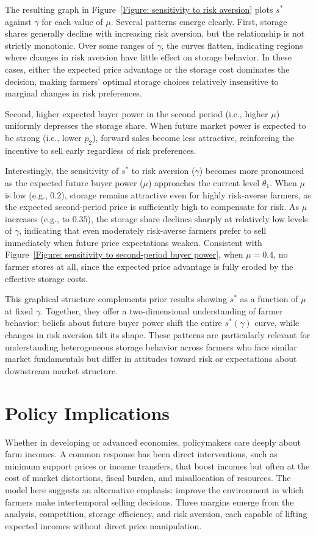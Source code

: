 The resulting graph in Figure~\ref{Figure: sensitivity to risk aversion} plots $s^*$ against $\gamma$ for each value of $\mu$. Several patterns emerge clearly. First, storage shares generally decline with increasing risk aversion, but the relationship is not strictly monotonic. Over some ranges of $\gamma$, the curves flatten, indicating regions where changes in risk aversion have little effect on storage behavior. In these cases, either the expected price advantage or the storage cost dominates the decision, making farmers' optimal storage choices relatively insensitive to marginal changes in risk preferences. 

Second, higher expected buyer power in the second period (i.e., higher $\mu$) uniformly depresses the storage share. When future market power is expected to be strong (i.e., lower $p_2$), forward sales become less attractive, reinforcing the incentive to sell early regardless of risk preferences.

Interestingly, the sensitivity of $s^*$ to risk aversion ($\gamma$) becomes more pronounced as the expected future buyer power ($\mu$) approaches the current level $\theta_1$. When $\mu$ is low (e.g., $0.2$), storage remains attractive even for highly risk-averse farmers, as the expected second-period price is sufficiently high to compensate for risk. As $\mu$ increases (e.g., to $0.35$), the storage share declines sharply at relatively low levels of $\gamma$, indicating that even moderately risk-averse farmers prefer to sell immediately when future price expectations weaken. Consistent with Figure~\ref{Figure: sensitivity to second-period buyer power}, when $\mu = 0.4$, no farmer stores at all, since the expected price advantage is fully eroded by the effective storage costs.


This graphical structure complements prior results showing $s^*$ as a function of $\mu$ at fixed $\gamma$. Together, they offer a two-dimensional understanding of farmer behavior: beliefs about future buyer power shift the entire $s^*(\gamma)$ curve, while changes in risk aversion tilt its shape. These patterns are particularly relevant for understanding heterogeneous storage behavior across farmers who face similar market fundamentals but differ in attitudes toward risk or expectations about downstream market structure.



\section{Policy Implications}
\noindent
Whether in developing or advanced economies, policymakers care deeply about farm incomes. A common response has been direct interventions, such as minimum support prices or income transfers, that boost incomes but often at the cost of market distortions, fiscal burden, and misallocation of resources. The model here suggests an alternative emphasis: improve the environment in which farmers make intertemporal selling decisions. Three margins emerge from the analysis, competition, storage efficiency, and risk aversion, each capable of lifting expected incomes without direct price manipulation.




